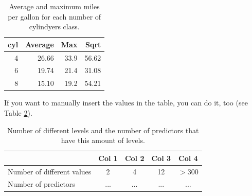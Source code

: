 \documentclass[
]{article}
\newenvironment{Shaded}{\begin{snugshade}}{\end{snugshade}}
\newcommand{\CharTok}[1]{\textcolor[rgb]{0.31,0.60,0.02}{#1}}
\newcommand{\CommentTok}[1]{\textcolor[rgb]{0.56,0.35,0.01}{\textit{#1}}}
\newcommand{\DataTypeTok}[1]{\textcolor[rgb]{0.13,0.29,0.53}{#1}}
\newcommand{\DecValTok}[1]{\textcolor[rgb]{0.00,0.00,0.81}{#1}}
\newcommand{\KeywordTok}[1]{\textcolor[rgb]{0.13,0.29,0.53}{\textbf{#1}}}
\newcommand{\NormalTok}[1]{#1}
\newcommand{\OperatorTok}[1]{\textcolor[rgb]{0.81,0.36,0.00}{\textbf{#1}}}
\newcommand{\StringTok}[1]{\textcolor[rgb]{0.31,0.60,0.02}{#1}}
\begin{document}
\begin{Shaded}
\end{Shaded}

\begin{table}[!h]

\caption{\label{tab:table1}\label{tab:tblname}Average and  maximum miles per gallon for each number of cylindyers class.}
\centering
\begin{tabular}[t]{rrrr}
\toprule
cyl & Average & Max & Sqrt\\
\midrule
\rowcolor{gray!6}  4 & 26.66 & 33.9 & 56.62\\
6 & 19.74 & 21.4 & 31.08\\
\rowcolor{gray!6}  8 & 15.10 & 19.2 & 54.21\\
\bottomrule
\end{tabular}
\end{table}

If you want to manually insert the values in the table, you can do it,
too (see Table \ref{tab:tab2}).

\begin{table}[H]
\caption{\label{tab:tab2}Number of different levels and the number of predictors that have this amount of levels.}
\centering
\begin{tabular}{lcccc}
\toprule
 & Col 1 & Col 2 & Col 3 & Col 4\\
\midrule
\rowcolor{gray!6}
Number of different values & 2 & 4 & 12 & $> 300$\\
Number of predictors & ... & ... & ... & ...\\
\bottomrule
\end{tabular}
\end{table}
\end{document}
